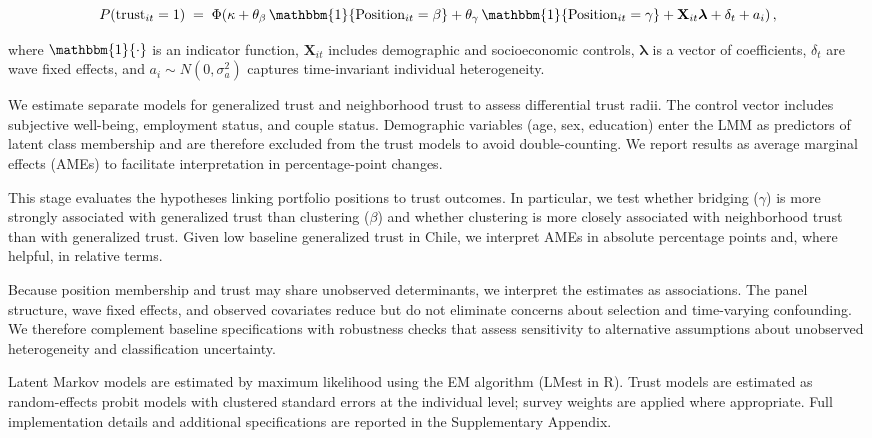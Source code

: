 \begin{equation}
P(\text{trust}_{it}=1) \;=\; \Phi\!\left(\kappa
+ \theta_{\beta}\,\mathbbm{1}\{\text{Position}_{it}=\beta\}
+ \theta_{\gamma}\,\mathbbm{1}\{\text{Position}_{it}=\gamma\}
+ \mathbf{X}_{it}\boldsymbol{\lambda}
+ \delta_t + a_i\right),
\end{equation}

where $\mathbbm{1}\{\cdot\}$ is an indicator function, $\mathbf{X}_{it}$ includes demographic and socioeconomic controls, $\boldsymbol{\lambda}$ is a vector of coefficients, $\delta_t$ are wave fixed effects, and $a_i\sim N(0,\sigma_a^2)$ captures time-invariant individual heterogeneity.

We estimate separate models for generalized trust and neighborhood trust to assess differential trust radii. The control vector includes subjective well-being, employment status, and couple status. Demographic variables (age, sex, education) enter the LMM as predictors of latent class membership and are therefore excluded from the trust models to avoid double-counting. We report results as average marginal effects (AMEs) to facilitate interpretation in percentage-point changes.

This stage evaluates the hypotheses linking portfolio positions to trust outcomes. In particular, we test whether bridging ($\gamma$) is more strongly associated with generalized trust than clustering ($\beta$) and whether clustering is more closely associated with neighborhood trust than with generalized trust. Given low baseline generalized trust in Chile, we interpret AMEs in absolute percentage points and, where helpful, in relative terms.

Because position membership and trust may share unobserved determinants, we interpret the estimates as associations. The panel structure, wave fixed effects, and observed covariates reduce but do not eliminate concerns about selection and time-varying confounding. We therefore complement baseline specifications with robustness checks that assess sensitivity to alternative assumptions about unobserved heterogeneity and classification uncertainty.

Latent Markov models are estimated by maximum likelihood using the EM algorithm (LMest in R). Trust models are estimated as random-effects probit models with clustered standard errors at the individual level; survey weights are applied where appropriate. Full implementation details and additional specifications are reported in the Supplementary Appendix.

